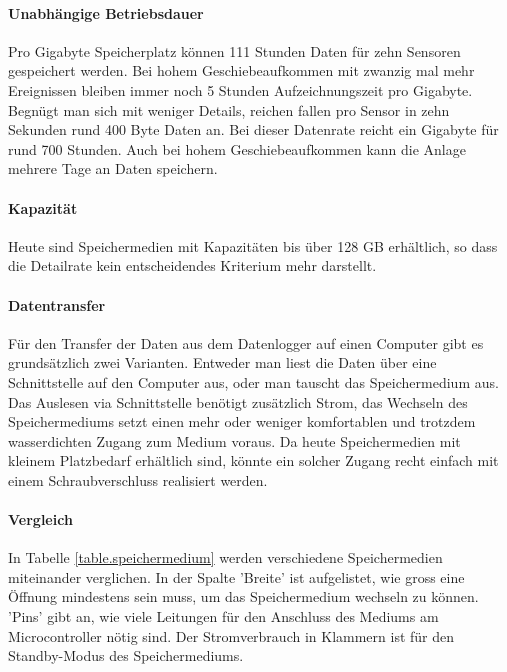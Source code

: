 \paragraph{Unabhängige Betriebsdauer} Pro Gigabyte Speicherplatz können 111 Stunden Daten für zehn Sensoren gespeichert werden. Bei hohem Geschiebeaufkommen mit zwanzig mal mehr Ereignissen bleiben immer noch 5 Stunden Aufzeichnungszeit pro Gigabyte. Begnügt man sich mit weniger Details, reichen fallen pro Sensor in zehn Sekunden rund 400 Byte Daten an. Bei dieser Datenrate reicht ein Gigabyte für rund 700 Stunden. Auch bei hohem Geschiebeaufkommen kann die Anlage mehrere Tage an Daten speichern. 

\paragraph{Kapazität} Heute sind Speichermedien mit Kapazitäten bis über 128 GB erhältlich, so dass die Detailrate kein entscheidendes Kriterium mehr darstellt.

\paragraph{Datentransfer} Für den Transfer der Daten aus dem Datenlogger auf einen Computer gibt es grundsätzlich zwei Varianten. Entweder man liest die Daten über eine Schnittstelle auf den Computer aus, oder man tauscht das Speichermedium aus. Das Auslesen via Schnittstelle benötigt zusätzlich Strom, das Wechseln des Speichermediums setzt einen mehr oder weniger komfortablen und trotzdem wasserdichten Zugang zum Medium voraus. Da heute Speichermedien mit kleinem Platzbedarf erhältlich sind, könnte ein solcher Zugang recht einfach mit einem Schraubverschluss realisiert werden.

\paragraph{Vergleich} In Tabelle \ref{table.speichermedium} werden verschiedene Speichermedien miteinander verglichen. In der Spalte 'Breite' ist aufgelistet, wie gross eine Öffnung mindestens sein muss, um das Speichermedium wechseln zu können. 'Pins' gibt an, wie viele Leitungen für den Anschluss des Mediums am Microcontroller nötig sind. Der Stromverbrauch in Klammern ist für den Standby-Modus des Speichermediums.


